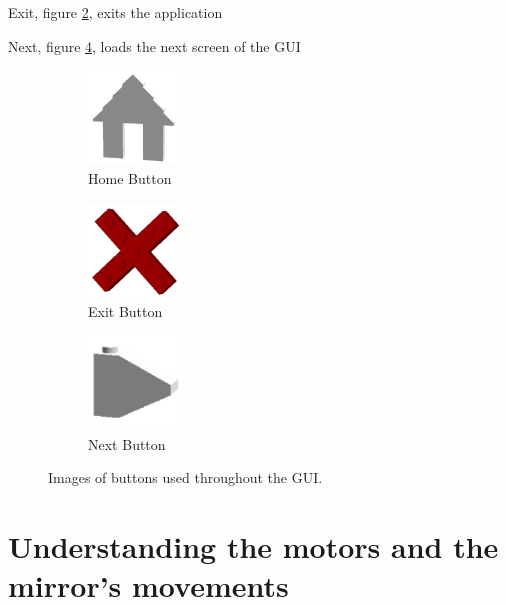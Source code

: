 \documentclass[a4paper, 12pt]{book}
\begin{document}
Exit, figure \ref{fig:Exit Button}, exits the application

Next, figure \ref{fig:Next Button}, loads the next screen of the GUI

\begin{figure}[ht]
\centering
\begin{subfigure}{.25\textwidth}
\centering
\includegraphics[width=25mm]{Home_Button.png}
\caption{Home Button}
\label{fig:Home Button}
\end{subfigure}
\begin{subfigure}{.25\textwidth}
\centering
\includegraphics[width=25mm]{Exit_Button.png}
\caption{Exit Button}
\label{fig:Exit Button}
\end{subfigure}
\begin{subfigure}{.25\textwidth}
\centering
\includegraphics[width=25mm]{Next_Button.png}
\caption{Next Button}
\label{fig:Next Button}
\end{subfigure}
\caption{Images of buttons used throughout the GUI.}
\end{figure}


\section{Understanding the motors and the mirror's movements}
\label{motor section}
\end{document}
